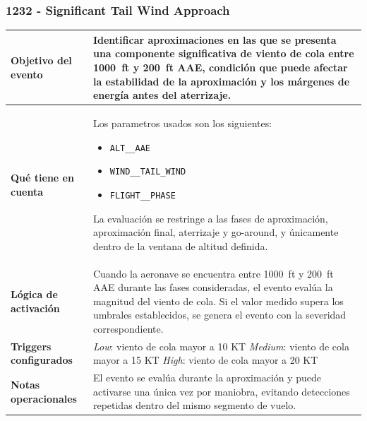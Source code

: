\documentclass[11pt,a4paper]{article}
\begin{document}
	\subsubsection{1232 - Significant Tail Wind Approach}
	\begin{table}[H]
		\centering
		\renewcommand{\arraystretch}{1.3}
		\begin{tabular}{p{5cm} p{9.5cm}}
			\hline
			\textbf{Objetivo del evento} &
			Identificar aproximaciones en las que se presenta una componente significativa de viento de cola entre \SI{1000}{ft} y \SI{200}{ft} AAE, condición que puede afectar la estabilidad de la aproximación y los márgenes de energía antes del aterrizaje. \\
			\hline
			\textbf{Qué tiene en cuenta} & Los parametros usados son los siguientes:
			\begin{itemize}
				\item \texttt{ALT\_\_AAE}
				\item \texttt{WIND\_\_TAIL\_WIND}
				\item \texttt{FLIGHT\_\_PHASE}
			\end{itemize}
			La evaluación se restringe a las fases de aproximación, aproximación final, aterrizaje y go-around, y únicamente dentro de la ventana de altitud definida. \\
			\hline
			\textbf{Lógica de activación} &
			Cuando la aeronave se encuentra entre \SI{1000}{ft} y \SI{200}{ft} AAE durante las fases consideradas, el evento evalúa la magnitud del viento de cola. Si el valor medido supera los umbrales establecidos, se genera el evento con la severidad correspondiente. \\
			\hline
			\textbf{Triggers configurados} &
			\textit{Low}: viento de cola mayor a 10 KT \newline
			\textit{Medium}: viento de cola mayor a 15 KT \newline
			\textit{High}: viento de cola mayor a 20 KT \\
			\hline
			\textbf{Notas operacionales} &
			El evento se evalúa durante la aproximación y puede activarse una única vez por maniobra, evitando detecciones repetidas dentro del mismo segmento de vuelo. \\
			\hline
		\end{tabular}
	\end{table}
\end{document}
